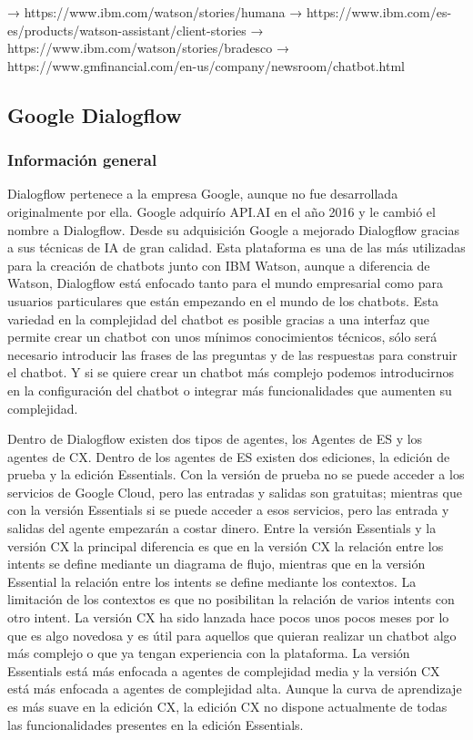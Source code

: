 → https://www.ibm.com/watson/stories/humana
→ https://www.ibm.com/es-es/products/watson-assistant/client-stories
→ https://www.ibm.com/watson/stories/bradesco
→ https://www.gmfinancial.com/en-us/company/newsroom/chatbot.html


\subsection{Google Dialogflow}\label{subsec:dialogflow}

\subsubsection*{Información general}

Dialogflow pertenece a la empresa Google, aunque no fue desarrollada originalmente por ella. Google adquirío API.AI en el año 2016 y le cambió el nombre a Dialogflow. Desde su adquisición Google a mejorado Dialogflow gracias a sus técnicas de IA de gran calidad. Esta plataforma es una de las más utilizadas para la creación de chatbots junto con IBM Watson, aunque a diferencia de Watson, Dialogflow está enfocado tanto para el mundo empresarial como para usuarios particulares que están empezando en el mundo de los chatbots. Esta variedad en la complejidad del chatbot es posible gracias a una interfaz que permite crear un chatbot con unos mínimos conocimientos técnicos, sólo será necesario introducir las frases de las preguntas y de las respuestas para construir el chatbot. Y si se quiere crear un chatbot más complejo podemos introducirnos en la configuración del chatbot o integrar más funcionalidades que aumenten su complejidad.

Dentro de Dialogflow existen dos tipos de agentes, los Agentes de ES y los agentes de CX. Dentro de los agentes de ES existen dos ediciones, la edición de prueba y la edición Essentials. Con la versión de prueba no se puede acceder a los servicios de Google Cloud, pero las entradas y salidas son gratuitas; mientras que con la versión Essentials si se puede acceder a esos servicios, pero las entrada y salidas del agente empezarán a costar dinero. Entre la versión Essentials y la versión CX la principal diferencia es que en la versión CX la relación entre los intents se define mediante un diagrama de flujo, mientras que en la versión Essential la relación entre los intents se define mediante los contextos. La limitación de los contextos es que no posibilitan la relación de varios intents con otro intent. La versión CX ha sido lanzada hace pocos unos pocos meses por lo que es algo novedosa y es útil para aquellos que quieran realizar un chatbot algo más complejo o que ya tengan experiencia con la plataforma. La versión Essentials está más enfocada a agentes de complejidad media y la versión CX está más enfocada a agentes de complejidad alta. Aunque la curva de aprendizaje es más suave en la edición CX, la edición CX no dispone actualmente de todas las funcionalidades presentes en la edición Essentials.

